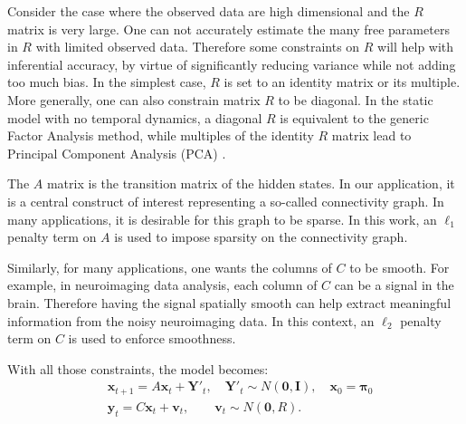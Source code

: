 \documentclass[fleqn,12pt]{article}
\providecommand{\mb}[1]{\boldsymbol{#1}}
\newcommand{\bx}{\mb{x}}
\newcommand{\by}{\mb{y}}
\newcommand{\bY}{\mb{Y}}
\begin{document}
Consider the case where the observed data are high dimensional and the $R$ matrix is very large. One can not accurately estimate the many free parameters in $R$ with limited observed data. Therefore some constraints on $R$ will help with inferential accuracy, by virtue of significantly reducing variance while not adding too much bias. In the simplest case, $R$ is set to an identity matrix or its multiple. More generally, one can also constrain matrix $R$ to be diagonal. In the static model with no temporal dynamics, a diagonal $R$ is equivalent to the generic Factor Analysis method, while multiples of the identity $R$ matrix lead to Principal Component Analysis (PCA) \citep{roweis1999unifying}.

The $A$ matrix is the transition matrix of the hidden states. In our application, it is a central construct of interest representing a so-called connectivity graph. In many applications, it is desirable for this graph to be sparse. In this work, an $\ell_1$ penalty term on $A$ is used to impose sparsity on the connectivity graph.

Similarly, for many applications, one wants the columns of $C$ to be smooth. For example, in neuroimaging data analysis, each column of $C$ can be a signal in the brain. Therefore having the signal spatially smooth can help extract meaningful information from the noisy neuroimaging data. In this context, an $\ell_2$ penalty term on $C$ is used to enforce smoothness.

With all those constraints, the model becomes:
\begin{equation}\label{eq:model0}
\begin{aligned}
	&\bx_{t+1}=A\bx_{t}+\bY'_t, \quad \bY'_t\sim N(\mathbf{0},\mathbf{I}),\quad \bx_0 = \mathbf{\pi}_0\\
	&\by_t=C\bx_t+\mathbf{v}_t,\qquad \mathbf{v}_t\sim N(\mathbf{0},R).
\end{aligned}
\end{equation}
\end{document}
